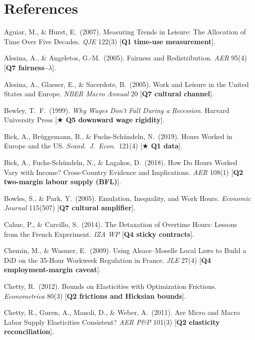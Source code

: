 \documentclass[9pt,a4paper]{extarticle}
\begin{document}
\section*{References}
\begingroup
\setlength{\parindent}{-1.2em}\setlength{\leftskip}{1.2em}
\scriptsize

Aguiar, M., \& Hurst, E.\ (2007). Measuring Trends in Leisure: The
Allocation of Time Over Five Decades. \emph{QJE} 122(3)
[\textbf{Q1 time-use measurement}].

Alesina, A., \& Angeletos, G.-M.\ (2005). Fairness and Redistribution.
\emph{AER} 95(4) [\textbf{Q7 fairness--$\lambda$}].

Alesina, A., Glaeser, E., \& Sacerdote, B.\ (2005). Work and Leisure
in the United States and Europe. \emph{NBER Macro Annual} 20
[\textbf{Q7 cultural channel}].

Bewley, T.\ F.\ (1999). \emph{Why Wages Don't Fall During a Recession}.
Harvard University Press [\textbf{$\bigstar$ Q5 downward wage
rigidity}].

Bick, A., Br\"uggemann, B., \& Fuchs-Sch\"undeln, N.\ (2019). Hours
Worked in Europe and the US. \emph{Scand.\ J.\ Econ.}\ 121(4)
[\textbf{$\bigstar$ Q1 data}].

Bick, A., Fuchs-Sch\"undeln, N., \& Lagakos, D.\ (2018). How Do Hours
Worked Vary with Income? Cross-Country Evidence and Implications.
\emph{AER} 108(1) [\textbf{Q2 two-margin labour supply (BFL)}].

Bowles, S., \& Park, Y.\ (2005). Emulation, Inequality, and Work
Hours. \emph{Economic Journal} 115(507) [\textbf{Q7 cultural amplifier}].

Cahuc, P., \& Carcillo, S.\ (2014). The Detaxation of Overtime Hours:
Lessons from the French Experiment. \emph{IZA WP} [\textbf{Q4 sticky
contracts}].

Chemin, M., \& Wasmer, E.\ (2009). Using Alsace--Moselle Local Laws
to Build a DiD on the 35-Hour Workweek Regulation in France.
\emph{JLE} 27(4) [\textbf{Q4 employment-margin caveat}].

Chetty, R.\ (2012). Bounds on Elasticities with Optimization Frictions.
\emph{Econometrica} 80(3) [\textbf{Q2 frictions and Hicksian bounds}].

Chetty, R., Guren, A., Manoli, D., \& Weber, A.\ (2011). Are Micro and
Macro Labor Supply Elasticities Consistent? \emph{AER P\&P} 101(3)
[\textbf{Q2 elasticity reconciliation}].
\end{document}
